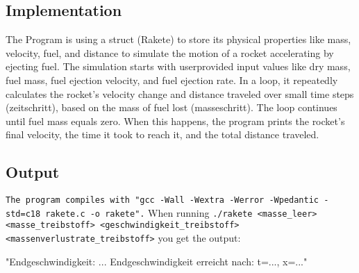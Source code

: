 \documentclass[12pt,a4paper]{article}
\begin{document}
\subsection{Implementation}
The Program is using a struct (Rakete) to store its physical properties like mass, velocity, fuel,
and distance to simulate the motion of a rocket accelerating by ejecting fuel. The simulation
starts with userprovided input values like dry mass, fuel mass, fuel ejection velocity, and fuel
ejection rate. In a loop, it repeatedly calculates the rocket’s velocity change and distance
traveled over small time steps (zeitschritt), based on the mass of fuel lost (masseschritt). The
loop continues until fuel mass equals zero. When this happens, the program prints the rocket’s
final velocity, the time it took to reach it, and the total distance traveled.

\vspace{1cm}

\subsection{Output}
\texttt{The program compiles with "gcc -Wall -Wextra -Werror -Wpedantic -std=c18 rakete.c -o rakete".}
When running \texttt{./rakete <masse\_leer> <masse\_treibstoff> <geschwindigkeit\_treibstoff> <massenverlustrate\_treibstoff>} 
you get the output:

\vspace{1cm}

"Endgeschwindigkeit: ...
\newline
Endgeschwindigkeit erreicht nach: t=..., x=..."

\vspace{1cm}
\end{document}
